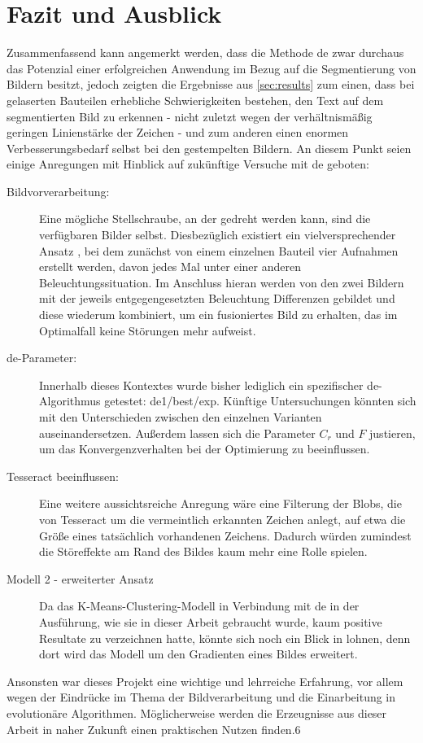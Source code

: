 \chapter{Fazit und Ausblick}
\label{sec:summary}

	Zusammenfassend kann angemerkt werden, dass die Methode \gls{de} zwar durchaus das Potenzial einer erfolgreichen Anwendung im Bezug auf die Segmentierung von Bildern besitzt, jedoch zeigten die Ergebnisse aus \ref{sec:results} zum einen, dass bei gelaserten Bauteilen erhebliche Schwierigkeiten bestehen, den Text auf dem segmentierten Bild zu erkennen - nicht zuletzt wegen der verhältnismäßig geringen Linienstärke der Zeichen - und zum anderen einen enormen Verbesserungsbedarf selbst bei den gestempelten Bildern. An diesem Punkt seien einige Anregungen mit Hinblick auf zukünftige Versuche mit \gls{de} geboten:
	
	\begin{description}
		\item[Bildvorverarbeitung:] Eine mögliche Stellschraube, an der gedreht werden kann, sind die verfügbaren Bilder selbst. Diesbezüglich existiert ein vielversprechender Ansatz \cite{chinese-method}, bei dem zunächst von einem einzelnen Bauteil vier Aufnahmen erstellt werden, davon jedes Mal unter einer anderen Beleuchtungssituation. Im Anschluss hieran werden von den zwei Bildern mit der jeweils entgegengesetzten Beleuchtung Differenzen gebildet und diese wiederum kombiniert, um ein fusioniertes Bild zu erhalten, das im Optimalfall keine Störungen mehr aufweist.
		\item[\gls{de}-Parameter:] Innerhalb dieses Kontextes wurde bisher lediglich ein spezifischer \gls{de}-Algorithmus getestet: \gls{de}1/best/exp. Künftige Untersuchungen könnten sich mit den Unterschieden zwischen den einzelnen Varianten auseinandersetzen. Außerdem lassen sich die Parameter $C_{r}$ und $F$ justieren, um das Konvergenzverhalten bei der Optimierung zu beeinflussen.
		\item[Tesseract beeinflussen:] Eine weitere aussichtsreiche Anregung wäre eine Filterung der Blobs, die von Tesseract um die vermeintlich erkannten Zeichen anlegt, auf etwa die Größe eines tatsächlich vorhandenen Zeichens. Dadurch würden zumindest die Störeffekte am Rand des Bildes kaum mehr eine Rolle spielen.
		\item[Modell 2 - erweiterter Ansatz] Da das K-Means-Clustering-Modell in Verbindung mit \gls{de} in der Ausführung, wie sie in dieser Arbeit gebraucht wurde, kaum positive Resultate zu verzeichnen hatte, könnte sich noch ein Blick in \cite{mozdren-meth2} lohnen, denn dort wird das Modell um den Gradienten eines Bildes erweitert. 
	\end{description}
	
	Ansonsten war dieses Projekt eine wichtige und lehrreiche Erfahrung, vor allem wegen der Eindrücke im Thema der Bildverarbeitung und die Einarbeitung in evolutionäre Algorithmen. Möglicherweise werden die Erzeugnisse aus dieser Arbeit in naher Zukunft einen praktischen Nutzen finden.6